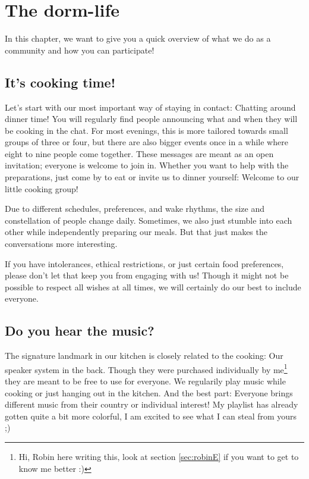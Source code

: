 \chapter{The dorm-life} \label{chap:activities}

In this chapter, we want to give you a quick overview of what we do as a community and how you can participate!

\section{It's cooking time!} \label{sec:cooking}
Let's start with our most important way of staying in contact: Chatting around dinner time! You will regularly find people announcing what and when they will be cooking in the chat. For most evenings, this is more tailored towards small groups of three or four, but there are also bigger events once in a while where eight to nine people come together. These messages are meant as an open invitation; everyone is welcome to join in. Whether you want to help with the preparations, just come by to eat or invite us to dinner yourself: Welcome to our little cooking group!

Due to different schedules, preferences, and wake rhythms, the size and constellation of people change daily. Sometimes, we also just stumble into each other while independently preparing our meals. But that just makes the conversations more interesting.

If you have intolerances, ethical restrictions, or just certain food preferences, please don't let that keep you from engaging with us! Though it might not be possible to respect all wishes at all times, we will certainly do our best to include everyone.

\section{Do you hear the music?} \label{sec:speakers}
The signature landmark in our kitchen is closely related to the cooking: Our speaker system in the back. Though they were purchased individually by me\footnote{Hi, Robin here writing this, look at section \ref{sec:robinE} if you want to get to know me better :)} they are meant to be free to use for everyone. We regularily play music while cooking or just hanging out in the kitchen. And the best part: Everyone brings different music from their country or individual interest! My playlist has already gotten quite a bit more colorful, I am excited to see what I can steal from yours ;)

